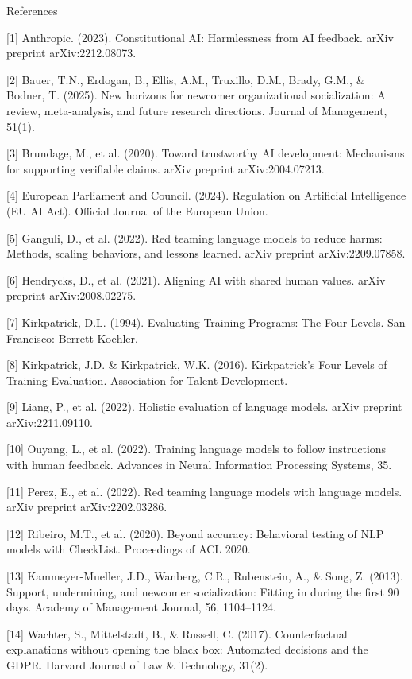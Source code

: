 References

[1] Anthropic. (2023). Constitutional AI: Harmlessness from AI feedback. arXiv preprint arXiv:2212.08073.

[2] Bauer, T.N., Erdogan, B., Ellis, A.M., Truxillo, D.M., Brady, G.M., \& Bodner, T. (2025). New horizons for newcomer organizational socialization: A review, meta-analysis, and future research directions. Journal of Management, 51(1).

[3] Brundage, M., et al. (2020). Toward trustworthy AI development: Mechanisms for supporting verifiable claims. arXiv preprint arXiv:2004.07213.

[4] European Parliament and Council. (2024). Regulation on Artificial Intelligence (EU AI Act). Official Journal of the European Union.

[5] Ganguli, D., et al. (2022). Red teaming language models to reduce harms: Methods, scaling behaviors, and lessons learned. arXiv preprint arXiv:2209.07858.

[6] Hendrycks, D., et al. (2021). Aligning AI with shared human values. arXiv preprint arXiv:2008.02275.

[7] Kirkpatrick, D.L. (1994). Evaluating Training Programs: The Four Levels. San Francisco: Berrett-Koehler.

[8] Kirkpatrick, J.D. \& Kirkpatrick, W.K. (2016). Kirkpatrick's Four Levels of Training Evaluation. Association for Talent Development.

[9] Liang, P., et al. (2022). Holistic evaluation of language models. arXiv preprint arXiv:2211.09110.

[10] Ouyang, L., et al. (2022). Training language models to follow instructions with human feedback. Advances in Neural Information Processing Systems, 35.

[11] Perez, E., et al. (2022). Red teaming language models with language models. arXiv preprint arXiv:2202.03286.

[12] Ribeiro, M.T., et al. (2020). Beyond accuracy: Behavioral testing of NLP models with CheckList. Proceedings of ACL 2020.

[13] Kammeyer-Mueller, J.D., Wanberg, C.R., Rubenstein, A., \& Song, Z. (2013). Support, undermining, and newcomer socialization: Fitting in during the first 90 days. Academy of Management Journal, 56, 1104--1124.

[14] Wachter, S., Mittelstadt, B., \& Russell, C. (2017). Counterfactual explanations without opening the black box: Automated decisions and the GDPR. Harvard Journal of Law \& Technology, 31(2).

